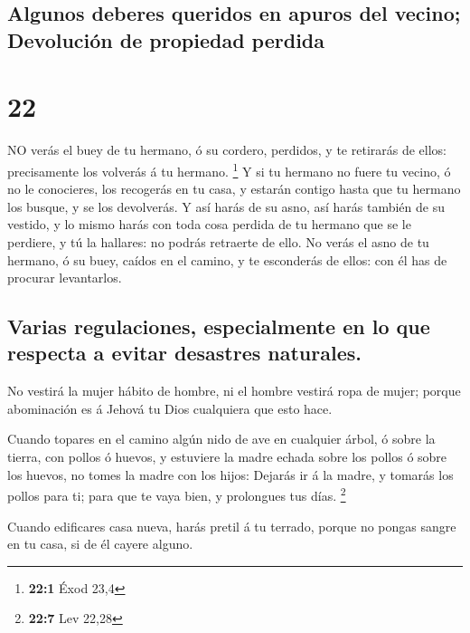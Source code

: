 \hypertarget{algunos-deberes-queridos-en-apuros-del-vecino-devoluciuxf3n-de-propiedad-perdida}{%
\subsection{Algunos deberes queridos en apuros del vecino; Devolución de
propiedad
perdida}\label{algunos-deberes-queridos-en-apuros-del-vecino-devoluciuxf3n-de-propiedad-perdida}}

\hypertarget{section-21}{%
\section{22}\label{section-21}}

 NO verás el buey de tu hermano, ó su cordero, perdidos, y
te retirarás de ellos: precisamente los volverás á tu hermano.
\footnote{\textbf{22:1} Éxod 23,4}  Y si tu hermano no fuere
tu vecino, ó no le conocieres, los recogerás en tu casa, y estarán
contigo hasta que tu hermano los busque, y se los devolverás.
 Y así harás de su asno, así harás también de su vestido, y
lo mismo harás con toda cosa perdida de tu hermano que se le perdiere, y
tú la hallares: no podrás retraerte de ello.  No verás el
asno de tu hermano, ó su buey, caídos en el camino, y te esconderás de
ellos: con él has de procurar levantarlos.

\hypertarget{varias-regulaciones-especialmente-en-lo-que-respecta-a-evitar-desastres-naturales.}{%
\subsection{Varias regulaciones, especialmente en lo que respecta a
evitar desastres
naturales.}\label{varias-regulaciones-especialmente-en-lo-que-respecta-a-evitar-desastres-naturales.}}

 No vestirá la mujer hábito de hombre, ni el hombre vestirá
ropa de mujer; porque abominación es á Jehová tu Dios cualquiera que
esto hace.

 Cuando topares en el camino algún nido de ave en cualquier
árbol, ó sobre la tierra, con pollos ó huevos, y estuviere la madre
echada sobre los pollos ó sobre los huevos, no tomes la madre con los
hijos:  Dejarás ir á la madre, y tomarás los pollos para ti;
para que te vaya bien, y prolongues tus días. \footnote{\textbf{22:7}
  Lev 22,28}

 Cuando edificares casa nueva, harás pretil á tu terrado,
porque no pongas sangre en tu casa, si de él cayere alguno.

